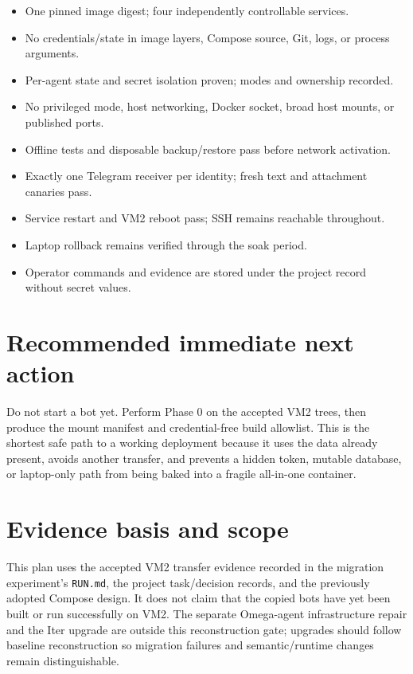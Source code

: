 \documentclass[11pt]{article}
\begin{document}
\begin{itemize}
\item One pinned image digest; four independently controllable services.
\item No credentials/state in image layers, Compose source, Git, logs, or process arguments.
\item Per-agent state and secret isolation proven; modes and ownership recorded.
\item No privileged mode, host networking, Docker socket, broad host mounts, or published ports.
\item Offline tests and disposable backup/restore pass before network activation.
\item Exactly one Telegram receiver per identity; fresh text and attachment canaries pass.
\item Service restart and VM2 reboot pass; SSH remains reachable throughout.
\item Laptop rollback remains verified through the soak period.
\item Operator commands and evidence are stored under the project record without secret values.
\end{itemize}

\section*{Recommended immediate next action}

Do not start a bot yet. Perform Phase 0 on the accepted VM2 trees, then produce the mount manifest and credential-free build allowlist. This is the shortest safe path to a working deployment because it uses the data already present, avoids another transfer, and prevents a hidden token, mutable database, or laptop-only path from being baked into a fragile all-in-one container.

\section*{Evidence basis and scope}

This plan uses the accepted VM2 transfer evidence recorded in the migration
experiment's \texttt{RUN.md}, the project task/decision records, and the
previously adopted Compose design. It does not claim that the
copied bots have yet been built or run successfully on VM2. The separate
Omega-agent infrastructure repair and the Iter upgrade are outside this
reconstruction gate; upgrades should follow baseline reconstruction so
migration failures and semantic/runtime changes remain distinguishable.
\end{document}
